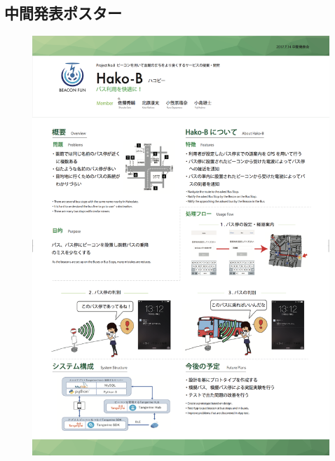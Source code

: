 \documentclass[openany,11pt,papersize]{jsbook}
\begin{document}
\begin{appendix}
\chapter{中間発表ポスター}
\begin{figure}[htbp]
  \begin{center}
    \includegraphics[clip,width=14cm]{img/poster.png}
    \label{fig:poster}
  \end{center}
\end{figure}


\end{appendix}
\end{document}
